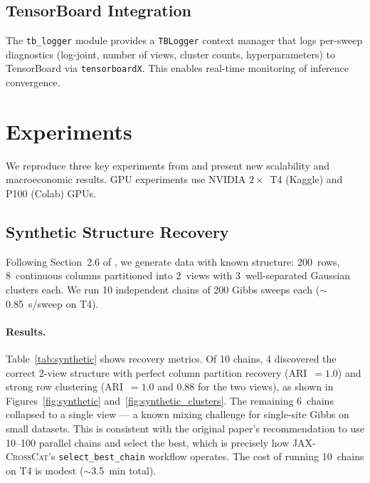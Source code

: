 \documentclass[11pt]{article}
\newcommand{\jaxcc}{\textsc{JAX-CrossCat}}
\begin{document}
\subsection{TensorBoard Integration}

The \texttt{tb\_logger} module provides a \texttt{TBLogger} context
manager that logs per-sweep diagnostics (log-joint, number of views,
cluster counts, hyperparameters) to TensorBoard via \texttt{tensorboardX}.
This enables real-time monitoring of inference convergence.

\section{Experiments}
\label{sec:experiments}

We reproduce three key experiments from \citet{mansinghka2016crosscat}
and present new scalability and macroeconomic results. GPU experiments
use NVIDIA $2\times$~T4 (Kaggle) and P100 (Colab) GPUs.

\subsection{Synthetic Structure Recovery}
\label{sec:synthetic}

Following Section~2.6 of \citet{mansinghka2016crosscat}, we generate
data with known structure: 200~rows, 8~continuous columns partitioned
into 2~views with 3~well-separated Gaussian clusters each. We run 10
independent chains of 200 Gibbs sweeps each (${\sim}$0.85~s/sweep on T4).

\paragraph{Results.} Table~\ref{tab:synthetic} shows recovery metrics.
Of 10 chains, 4 discovered the correct 2-view structure with perfect
column partition recovery (ARI~$= 1.0$) and strong row clustering
(ARI~$= 1.0$ and $0.88$ for the two views), as shown in
Figures~\ref{fig:synthetic} and~\ref{fig:synthetic_clusters}. The
remaining 6~chains collapsed to a single view --- a known mixing
challenge for single-site Gibbs on small datasets. This is consistent
with the original paper's recommendation to use 10--100 parallel chains
and select the best, which is precisely how \jaxcc{}'s
\texttt{select\_best\_chain} workflow operates. The cost of running
10~chains on T4 is modest (${\sim}$3.5~min total).
\end{document}
